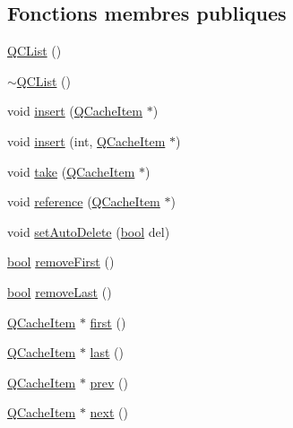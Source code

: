 \subsection*{Fonctions membres publiques}
\begin{DoxyCompactItemize}
\item 
\hyperlink{class_q_c_list_a6a4d9ccbceee2a31b1b48b4ba8eca779}{Q\+C\+List} ()
\item 
\hyperlink{class_q_c_list_a61907c37dad2e394be73526412bc9127}{$\sim$\+Q\+C\+List} ()
\item 
void \hyperlink{class_q_c_list_a6f4d847f23c531a9a059412c00b00438}{insert} (\hyperlink{struct_q_cache_item}{Q\+Cache\+Item} $\ast$)
\item 
void \hyperlink{class_q_c_list_ac6579ccf2871efe8ddf087b7d01614d0}{insert} (int, \hyperlink{struct_q_cache_item}{Q\+Cache\+Item} $\ast$)
\item 
void \hyperlink{class_q_c_list_afaaf6067e224a5db59e2e7fbf8ff643e}{take} (\hyperlink{struct_q_cache_item}{Q\+Cache\+Item} $\ast$)
\item 
void \hyperlink{class_q_c_list_a3f279b1182b07201de8daf38a0a9d857}{reference} (\hyperlink{struct_q_cache_item}{Q\+Cache\+Item} $\ast$)
\item 
void \hyperlink{class_q_c_list_a5af8e532bca9fd5c4dd7d69698d384c9}{set\+Auto\+Delete} (\hyperlink{qglobal_8h_a1062901a7428fdd9c7f180f5e01ea056}{bool} del)
\item 
\hyperlink{qglobal_8h_a1062901a7428fdd9c7f180f5e01ea056}{bool} \hyperlink{class_q_c_list_ae401d6ef00d0f95c06a3b9a6ea18fdf9}{remove\+First} ()
\item 
\hyperlink{qglobal_8h_a1062901a7428fdd9c7f180f5e01ea056}{bool} \hyperlink{class_q_c_list_ae1529d158a0ddb2ce5ef4207086fa972}{remove\+Last} ()
\item 
\hyperlink{struct_q_cache_item}{Q\+Cache\+Item} $\ast$ \hyperlink{class_q_c_list_abab090541c4ce24447cacf354d2b592f}{first} ()
\item 
\hyperlink{struct_q_cache_item}{Q\+Cache\+Item} $\ast$ \hyperlink{class_q_c_list_adf2d1d829928269b69f9b89e4d6e1b45}{last} ()
\item 
\hyperlink{struct_q_cache_item}{Q\+Cache\+Item} $\ast$ \hyperlink{class_q_c_list_a3dac765a4b638f7368b7041229fdf28d}{prev} ()
\item 
\hyperlink{struct_q_cache_item}{Q\+Cache\+Item} $\ast$ \hyperlink{class_q_c_list_a421ce185d4229ae0755ce0b33d34e74a}{next} ()
\end{DoxyCompactItemize}
